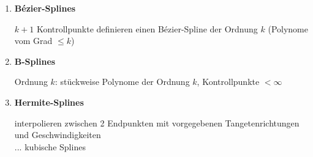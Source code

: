 \begin{enumerate}
\item \textbf{Bézier-Splines}
	\begin{center}
	\end{center}
	$k+1$ Kontrollpunkte definieren einen Bézier-Spline der Ordnung $k$ (Polynome vom Grad $\le k$)
\item \textbf{B-Splines}
	\begin{center}
	\end{center}
	Ordnung $k$: stückweise Polynome der Ordnung $k$, Kontrollpunkte $< \infty$
\item \textbf{Hermite-Splines}
	\begin{center}
	\end{center}
	interpolieren zwischen 2 Endpunkten mit vorgegebenen Tangetenrichtungen und Geschwindigkeiten\\
	$...$ kubische Splines
	\begin{center}
	\end{center}

\end{enumerate}